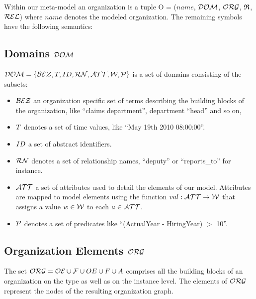 Within our meta-model an organization is a tuple O = ($name$, $\mathcal{DOM}$, $\mathcal{ORG}$, $\mathfrak{R}$, $\mathcal{REL}$) where $name$ denotes the modeled organization. The remaining symbols have the following semantics:

\subsection{Domains $\mathcal{DOM}$}
	$\mathcal{DOM} = \{ \mathcal{BEZ}, T, ID, \mathcal{RN}, \mathcal{ATT}, \mathcal{W}, \mathcal{P} \} $ is a set
	of domains consisting of the subsets:

	\begin{itemize}

	\item $\mathcal{BEZ}$ an organization specific set of terms describing the building blocks of the
	organization, like "`claims department"', department "`head"' and so on, 

	\item $T$ denotes a set of time values, like ``May 19th 2010 08:00:00''.

	\item $ID$ a set of abstract identifiers.

	\item $\mathcal{RN}$ denotes a set of relationship names, "`deputy"' or "`reports\_to"' for instance. 

	\item $\mathcal{ATT}$ a set of attributes used to detail the elements of our model. Attributes are mapped to model elements using the function  $val: \mathcal{ATT} \rightarrow \mathcal{W}$ that assigns a value $w \in \mathcal{W}$ to each
	$a \in \mathcal{ATT}$.

	\item	$\mathcal{P}$ denotes a set of predicates like "`(ActualYear - HiringYear) $>$ 10"'.

	\end{itemize}

\subsection{Organization Elements $\mathcal{ORG}$}
	The set $\mathcal{ORG} = \mathcal{OE} \cup \mathcal{F} \cup OE \cup F \cup A $ comprises all the building blocks of an organization on the type as well as on the instance level. The elements of $\mathcal{ORG}$ represent the nodes of the resulting organization graph.

